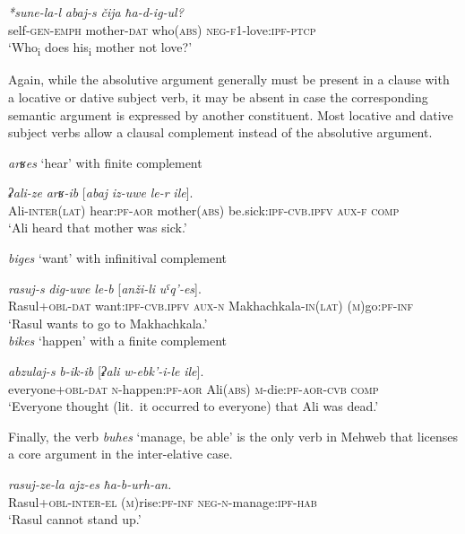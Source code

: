 ﻿\documentclass[output=paper]{langsci/langscibook}
\begin{document}
\ex %
\gll \emph{*sune-la-l} \emph{abaj-s} \emph{čija} \emph{ħa-d-ig-ul?}\\
self-\textsc{gen}-\textsc{emph} mother-\textsc{dat} who(\textsc{abs}) \textsc{neg}-\textsc{f1}-love:\textsc{ipf}-\textsc{ptcp}\\
\glt `Who\textsubscript{i} does his\textsubscript{i} mother not love?'
\z
\z

Again, while the absolutive argument generally must be present in a clause with a
locative or dative subject verb, it may be absent in case the
corresponding semantic argument is expressed by another constituent.
Most locative and dative subject verbs allow a clausal complement
instead of the absolutive argument.

\ea %
\emph{arʁes} `hear' with finite complement

\gll \emph{ʡali-ze} \emph{arʁ-ib} [\emph{abaj} \emph{iz-uwe} \emph{le-r} \emph{ile}].\\
Ali-\textsc{inter(lat)} hear:\textsc{pf}-\textsc{aor} mother(\textsc{abs}) be.sick:\textsc{ipf}-\textsc{cvb.ipfv} \textsc{aux}-\textsc{f} \textsc{comp}\\ 
\glt `Ali heard that mother was sick.'

\ex %
\emph{biges} `want' with infinitival complement

\gll \emph{rasuj-s} \emph{dig-uwe} \emph{le-b} [\emph{anži-li} \emph{uˤq'-es}].\\
Rasul+\textsc{obl}-\textsc{dat} want:\textsc{ipf}-\textsc{cvb.ipfv} \textsc{aux}-\textsc{n} Makhachkala-\textsc{in(lat)} (\textsc{m})go:\textsc{pf}-\textsc{inf}\\
\glt `Rasul wants to go to Makhachkala.'\\

\ex %
\emph{bikes} `happen' with a finite complement

\gll \emph{abzulaj-s} \emph{b-ik-ib} [\emph{ʡali} \emph{w-ebk'-i-le} \emph{ile}].\\
everyone+\textsc{obl}-\textsc{dat} \textsc{n}-happen:\textsc{pf}-\textsc{aor} Ali(\textsc{abs}) \textsc{m}-die:\textsc{pf}-\textsc{aor}-\textsc{cvb} \textsc{comp}\\
\glt `Everyone thought (lit.\ it occurred to everyone) that Ali was dead.'
\z

Finally, the verb \emph{buhes} `manage, be able' is the only verb in
Mehweb that licenses a core argument in the inter-elative case.

\ea \label{ex:7:35} %
\gll \emph{rasuj-ze-la} \emph{ajz-es} \emph{ħa-b-urh-an.}\\
Rasul+\textsc{obl}-\textsc{inter}-\textsc{el} (\textsc{m})rise:\textsc{pf}-\textsc{inf} \textsc{neg}-\textsc{n}-manage:\textsc{ipf}-\textsc{hab}\\
\glt `Rasul cannot stand up.'
\end{document}
